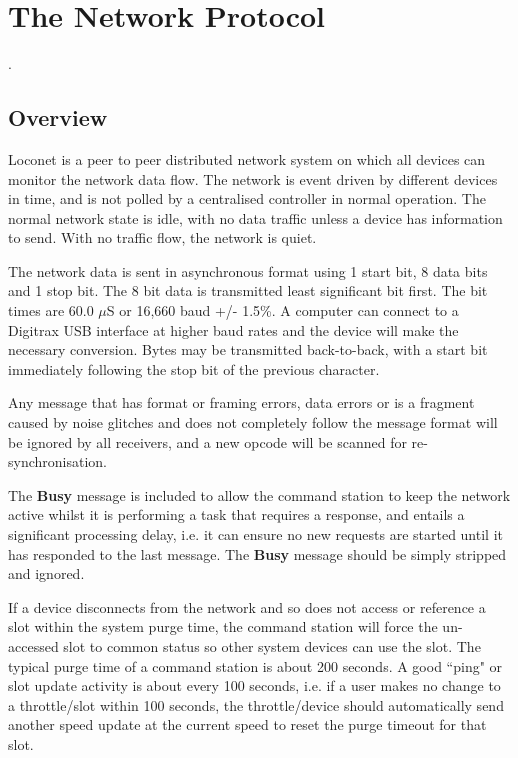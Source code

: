  

\chapter[Network Protocol]{The Network Protocol}.  

\section{Overview}

Loconet is a peer to peer distributed network system on which all devices can monitor the network data flow. The network is event driven by different devices in time, and is not polled by a centralised controller in normal operation. The normal network state is idle, with no data traffic unless a device has information to send. With no traffic flow, the network is quiet.

The network data is sent in asynchronous format using 1 start bit, 8 data bits and 1 stop bit. The 8 bit data is transmitted least significant bit first. The bit times are 60.0 $\mu$S or 16,660 baud +/- 1.5\%. A computer can connect to a Digitrax USB interface at higher baud rates and the device will make the necessary conversion. Bytes may be transmitted back-to-back, with a start bit immediately following the stop bit of the previous character. 

Any message that has format or framing errors, data errors or is a fragment caused by noise glitches and does not completely follow the message format will be ignored by all receivers, and a new opcode will be scanned for re-synchronisation.

The \textbf{Busy} message is included to allow the command station to keep the network active whilst it is performing a task that requires a response, and entails a significant processing delay, i.e. it can ensure no new requests are started until it has responded to the last message. The \textbf{Busy} message should be simply stripped and ignored.

If a device disconnects from the network and so does not access or reference a slot within the system purge time, the command station will force the un-accessed slot to common status so other system devices can use the slot. The typical purge time of a command station is about 200 seconds. A good ``ping" or slot update activity is about every 100 seconds, i.e. if a user makes no change to a throttle/slot within 100 seconds, the throttle/device should automatically send another speed update at the current speed to reset the purge timeout for that slot.

